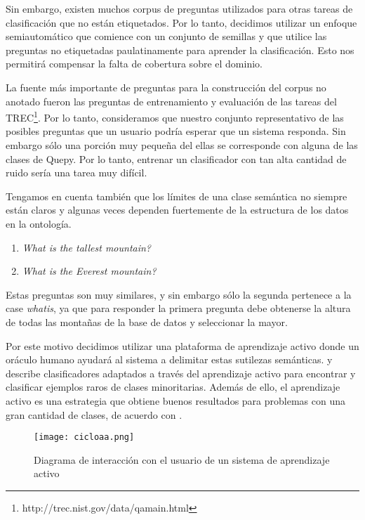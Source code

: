 Sin embargo, existen muchos corpus de preguntas utilizados para otras tareas de clasificación que no están etiquetados. Por lo tanto, decidimos utilizar un enfoque semiautomático que comience con un conjunto de semillas y que utilice las preguntas no etiquetadas paulatinamente para aprender la clasificación. Esto nos permitirá compensar la falta de cobertura sobre el dominio.

La fuente más importante de preguntas para la construcción del corpus no anotado fueron las preguntas de entrenamiento y evaluación de las tareas del TREC\footnote{http://trec.nist.gov/data/qamain.html}. Por lo tanto, consideramos que nuestro conjunto representativo de las posibles preguntas que un usuario podría esperar que un sistema responda. Sin embargo sólo una porción muy pequeña del ellas se corresponde con alguna de las clases de Quepy. Por lo tanto, entrenar un clasificador con tan alta cantidad de ruido sería una tarea muy difícil.

Tengamos en cuenta también que los límites de una clase semántica no siempre están claros y algunas veces dependen fuertemente de la estructura de los datos en la ontología.

\begin{example}\label{preguntas-similares}\hfill
    \begin{enumerate}
    \item \textit{What is the tallest mountain?}
    \item \textit{What is the Everest mountain?}
    \end{enumerate}
\end{example}

Estas preguntas son muy similares, y sin embargo sólo la segunda pertenece a la case \textit{whatis}, ya que para responder la primera pregunta debe obtenerse la altura de todas las montañas de la base de datos y seleccionar la mayor.

Por este motivo decidimos utilizar una plataforma de aprendizaje activo donde un oráculo humano ayudará al sistema a delimitar estas sutilezas semánticas. \citet{rare-classes-holpedales} y \citet{AL-imbalanced-Ertekin} describe clasificadores adaptados a través del aprendizaje activo para encontrar y clasificar ejemplos raros de clases minoritarias. Además de ello, el aprendizaje activo es una estrategia que obtiene buenos resultados para problemas con una gran cantidad de clases, de acuerdo con \citet{al-multiclass-jain}.

\begin{figure}[h]\label{cicloaa}
\caption{Diagrama de interacción con el usuario de un sistema de aprendizaje activo}
\texttt{[image: cicloaa.png]}
\centering
\end{figure}

